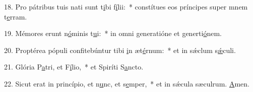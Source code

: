 18. Pro pátribus tuis nati sunt t\uline{i}bi f\uline{í}lii:~* constítues eos príncipes super mnem t\uline{e}rram.\par 
19. Mémores erunt n\uline{ó}minis t\uline{u}i:~* in omni generatióne et generti\uline{ó}nem.\par 
20. Proptérea pópuli confitebúntur tibi \uline{i}n æt\uline{é}rnum:~* et in sǽclum s\uline{ǽ}culi.\par 
21. Glória P\uline{a}tri, et F\uline{í}lio,~* et Spiríti S\uline{a}ncto.\par 
22. Sicut erat in princípio, et n\uline{u}nc, et s\uline{e}mper,~* et in sǽcula sæculrum. \uline{A}men.\par 
